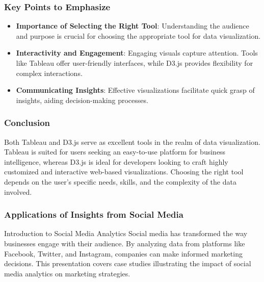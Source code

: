 \documentclass{beamer}
\begin{document}
\begin{frame}[fragile]
    \frametitle{Key Points to Emphasize}
    \begin{itemize}
        \item \textbf{Importance of Selecting the Right Tool}: Understanding the audience and purpose is crucial for choosing the appropriate tool for data visualization.
        \item \textbf{Interactivity and Engagement}: Engaging visuals capture attention. Tools like Tableau offer user-friendly interfaces, while D3.js provides flexibility for complex interactions.
        \item \textbf{Communicating Insights}: Effective visualizations facilitate quick grasp of insights, aiding decision-making processes.
    \end{itemize}
\end{frame}

\begin{frame}[fragile]
    \frametitle{Conclusion}
    Both Tableau and D3.js serve as excellent tools in the realm of data visualization. Tableau is suited for users seeking an easy-to-use platform for business intelligence, whereas D3.js is ideal for developers looking to craft highly customized and interactive web-based visualizations. Choosing the right tool depends on the user's specific needs, skills, and the complexity of the data involved.
\end{frame}

\begin{frame}[fragile]
    \frametitle{Applications of Insights from Social Media}
    \begin{block}{Introduction to Social Media Analytics}
        Social media has transformed the way businesses engage with their audience. By analyzing data from platforms like Facebook, Twitter, and Instagram, companies can make informed marketing decisions. This presentation covers case studies illustrating the impact of social media analytics on marketing strategies.
    \end{block}
\end{frame}
\end{document}
